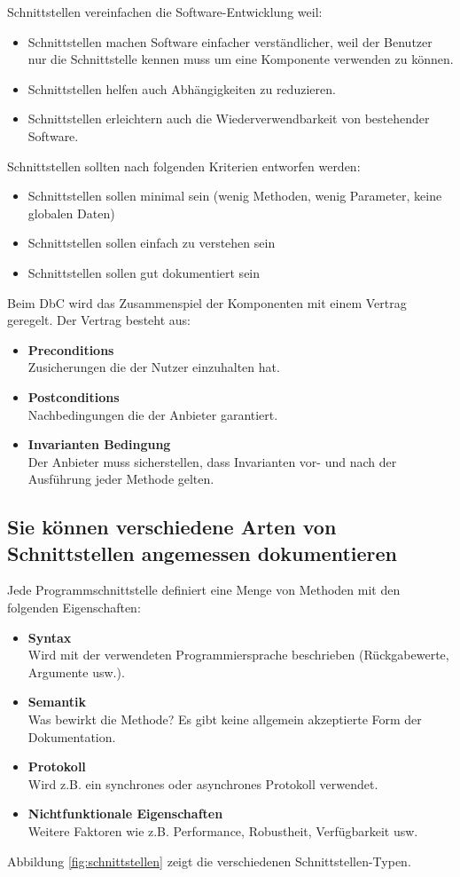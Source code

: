 Schnittstellen vereinfachen die Software-Entwicklung weil:
\begin{itemize}
	\item Schnittstellen machen Software einfacher verständlicher, weil der Benutzer nur die Schnittstelle kennen muss um eine Komponente verwenden zu können.
	\item Schnittstellen helfen auch Abhängigkeiten zu reduzieren.
	\item Schnittstellen erleichtern auch die Wiederverwendbarkeit von bestehender Software.
\end{itemize}
Schnittstellen sollten nach folgenden Kriterien entworfen werden:
\begin{itemize}
	\item Schnittstellen sollen minimal sein (wenig Methoden, wenig Parameter, keine globalen Daten)
	\item Schnittstellen sollen einfach zu verstehen sein
	\item Schnittstellen sollen gut dokumentiert sein
\end{itemize}
Beim \ac{DbC} wird das Zusammenspiel der Komponenten mit einem Vertrag geregelt. Der Vertrag besteht aus:
\begin{itemize}
	\item \textbf{Preconditions} \\
		  Zusicherungen die der Nutzer einzuhalten hat.
	\item \textbf{Postconditions} \\
		  Nachbedingungen die der Anbieter garantiert.
	\item \textbf{Invarianten Bedingung} \\ 
		  Der Anbieter muss sicherstellen, dass Invarianten vor- und nach der Ausführung jeder Methode gelten.
\end{itemize}

\subsection{Sie können verschiedene Arten von Schnittstellen angemessen dokumentieren}

Jede Programmschnittstelle definiert eine Menge von Methoden mit den folgenden Eigenschaften:
\begin{itemize}
	\item \textbf{Syntax} \\
		  Wird mit der verwendeten Programmiersprache beschrieben (Rückgabewerte, Argumente usw.).
	\item \textbf{Semantik} \\
		  Was bewirkt die Methode? Es gibt keine allgemein akzeptierte Form der Dokumentation.
	\item \textbf{Protokoll} \\
		  Wird z.B. ein synchrones oder asynchrones Protokoll verwendet.
	\item \textbf{Nichtfunktionale Eigenschaften} \\
		  Weitere Faktoren wie z.B. Performance, Robustheit, Verfügbarkeit usw.
\end{itemize}
Abbildung \ref{fig:schnittstellen} zeigt die verschiedenen Schnittstellen-Typen.

